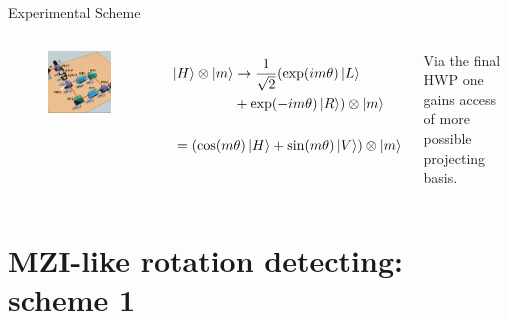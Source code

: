 \documentclass[amssymb, amsmath]{beamer}
\begin{document}
\begin{frame}{Experimental Scheme}

\begin{columns}

\begin{figure}
    \centering
    \includegraphics[width=1.00\textwidth]{fig/scheme_clipped.png}
\end{figure}

\begin{align}
    \ket{H}\otimes\ket{m} &\to \frac{1}{\sqrt{2}}(\exp(i m \theta)\ket{L}\nonumber\\
    &+ \exp(-i m \theta)\ket{R})\otimes\ket{m} \\\nonumber\\
    = (\cos(m & \theta)\ket{H}+\sin(m \theta)\ket{V})\otimes\ket{m}
\end{align}

\hspace{8pt} Via the final HWP one gains access of more possible projecting basis.

\end{columns}
\end{frame}

\section{MZI-like rotation detecting: scheme 1}
\end{document}
